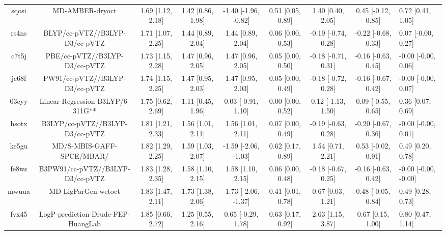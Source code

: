 \documentclass{article}
\begin{document}
\begin{center}
\begin{longtable}{|cccccccc|}
 sqosi &                                    MD-AMBER-dryoct &  1.69 [1.12, 2.18] &  1.42 [0.86, 1.98] &  -1.40 [-1.96, -0.82] &  0.51 [0.05, 0.89] &    1.40 [0.40, 2.05] &   0.45 [-0.12, 0.85] &     0.72 [0.41, 1.05] \\
 rs4ns &                     BLYP/cc-pVTZ//B3LYP-D3/cc-pVTZ &  1.71 [1.07, 2.25] &  1.44 [0.89, 2.04] &     1.44 [0.89, 2.04] &  0.06 [0.00, 0.53] &  -0.19 [-0.74, 0.28] &  -0.22 [-0.68, 0.33] &    0.07 [-0.00, 0.27] \\
 c7t5j &                      PBE/cc-pVTZ//B3LYP-D3/cc-pVTZ &  1.73 [1.15, 2.28] &  1.47 [0.96, 2.05] &     1.47 [0.96, 2.05] &  0.05 [0.00, 0.50] &  -0.18 [-0.71, 0.31] &  -0.16 [-0.63, 0.45] &   -0.00 [-0.00, 0.06] \\
 jc68f &                     PW91/cc-pVTZ//B3LYP-D3/cc-pVTZ &  1.74 [1.15, 2.25] &  1.47 [0.95, 2.03] &     1.47 [0.95, 2.03] &  0.05 [0.00, 0.49] &  -0.18 [-0.72, 0.28] &  -0.16 [-0.67, 0.42] &   -0.00 [-0.00, 0.07] \\
 03cyy &                   Linear Regression-B3LYP/6-311G** &  1.75 [0.62, 2.69] &  1.11 [0.45, 1.96] &    0.03 [-0.91, 1.10] &  0.00 [0.00, 0.52] &   0.12 [-1.13, 1.50] &   0.09 [-0.55, 0.65] &     0.36 [0.07, 0.69] \\
 hsotx &                    B3LYP/cc-pVTZ//B3LYP-D3/cc-pVTZ &  1.81 [1.21, 2.33] &  1.56 [1.01, 2.11] &     1.56 [1.01, 2.11] &  0.07 [0.00, 0.49] &  -0.19 [-0.63, 0.28] &  -0.20 [-0.67, 0.36] &   -0.00 [-0.00, 0.01] \\
 ke5gu &                          MD/S-MBIS-GAFF-SPCE/MBAR/ &  1.82 [1.29, 2.25] &  1.59 [1.03, 2.07] &  -1.59 [-2.06, -1.03] &  0.62 [0.17, 0.89] &    1.54 [0.71, 2.21] &   0.53 [-0.02, 0.91] &     0.49 [0.20, 0.78] \\
 fe8ws &                   B3PW91/cc-pVTZ//B3LYP-D3/cc-pVTZ &  1.83 [1.28, 2.35] &  1.58 [1.10, 2.15] &     1.58 [1.10, 2.15] &  0.06 [0.00, 0.48] &  -0.18 [-0.67, 0.25] &  -0.16 [-0.63, 0.42] &  -0.00 [-0.00, -0.00] \\
 mwuua &                                MD-LigParGen-wetoct &  1.83 [1.47, 2.11] &  1.73 [1.38, 2.06] &  -1.73 [-2.06, -1.37] &  0.41 [0.01, 0.78] &    0.67 [0.03, 1.21] &   0.48 [-0.05, 0.84] &     0.49 [0.28, 0.73] \\
 fyx45 &                 LogP-prediction-Drude-FEP-HuangLab &  1.85 [0.66, 2.72] &  1.25 [0.55, 2.16] &    0.65 [-0.29, 1.78] &  0.63 [0.17, 0.92] &    2.63 [1.15, 3.87] &    0.67 [0.15, 1.00] &     0.80 [0.47, 1.14] \\

\end{longtable}
\end{center}
\end{document}
